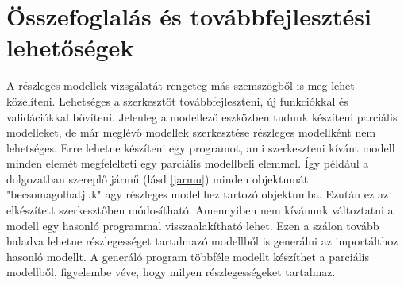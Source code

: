 \chapter{Összefoglalás és továbbfejlesztési lehetőségek}\label{chapter:summary}
A részleges modellek vizsgálatát rengeteg más szemszögből is meg lehet közelíteni. Lehetséges a szerkesztőt továbbfejleszteni, új funkciókkal és validációkkal bővíteni. 
Jelenleg a modellező eszközben tudunk készíteni parciális modelleket, de már meglévő modellek szerkesztése részleges modellként nem lehetséges. Erre lehetne készíteni egy programot, ami szerkeszteni kívánt modell minden elemét megfelelteti egy parciális modellbeli elemmel. Így például a dolgozatban szereplő jármű (lásd \autoref{jarmu}) minden objektumát "becsomagolhatjuk" agy részleges modellhez tartozó objektumba. Ezután ez az elkészített szerkesztőben módosítható. Amennyiben nem kívánunk változtatni a modell egy hasonló programmal visszaalakítható lehet. Ezen a szálon tovább haladva lehetne részlegességet tartalmazó modellből is generálni az importálthoz hasonló modellt. A generáló program többféle modellt készíthet a parciális modellből, figyelembe véve, hogy milyen részlegességeket tartalmaz.
